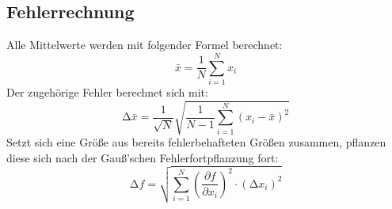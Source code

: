 \subsection{Fehlerrechnung}
\label{sec:Fehlerrechnung}

Alle Mittelwerte werden mit folgender Formel berechnet:
\begin{equation}
  \bar{x} = \frac{1}{N} \sum_{i = 1}^N x_i
  \label{eqn:fehler1}
\end{equation}
Der zugehörige Fehler berechnet sich mit:
\begin{equation}
  \increment \bar{x} = \frac{1}{\sqrt{N}} \sqrt{\frac{1}{N-1} \sum_{i = 1}^N (x_i - \bar{x})^2}
  \label{eqn:fehler2}
\end{equation}
Setzt sich eine Größe aus bereits fehlerbehafteten Größen zusammen, pflanzen diese sich nach der Gauß'schen Fehlerfortpflanzung fort:
\begin{equation}
  \increment f = \sqrt{\sum_{i = 1}^N \left(\frac{\partial f}{\partial x_i} \right)^2 \cdot(\increment x_i)^2}
  \label{eqn:fehler3}
\end{equation}
